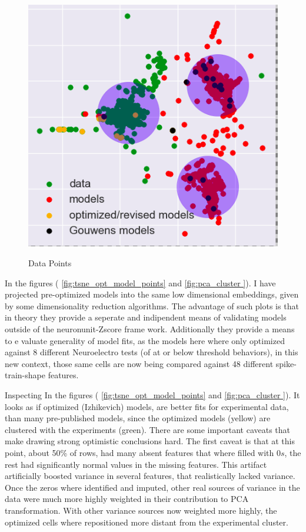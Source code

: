 \begin{figure}    
\begin{center} \includegraphics[width=0.75\linewidth]{figures/data_experiment_fits.png}
    \label{fig:}
\end{center}
\caption[PCA clustering]{Data Points}
\label{fig:pca_cluster}
\end{figure}    


In the figures ( \ref{fig:tsne_opt_model_points} and \ref{fig:pca_cluster
}). I have projected pre-optimized models into the same low dimensional embeddings, given by some dimensionality reduction algorithms. The advantage of such plots is that in theory they provide a seperate and indipendent means of validating models outside of the neuronunit-Zscore frame work. Additionally they provide a means to e valuate generality of model fits, as the models here where only optimized against 8 different Neuroelectro tests (of at or below threshold behaviors), in this new context, those same cells are now being compared against 48 different spike-train-shape features.

Inspecting In the figures ( \ref{fig:tsne_opt_model_points} and \ref{fig:pca_cluster
}). It looks as if optimized (Izhikevich) models, are better fits for experimental data, than many pre-published models, since the optimized models (yellow) are clustered with the experiments (green). There are some important caveats that make drawing strong optimistic conclusions hard. The first caveat is that at this point, about 50\% of rows, had many absent features that where filled with $0s$, the rest had significantly normal values in the missing features. This artifact artificially boosted variance in several features, that realistically lacked variance. Once the zeros where identified and imputed, other real sources of variance in the data were much more highly weighted in their contribution to PCA transformation. With other variance sources now weighted more highly, the optimized cells where repositioned more distant from the experimental cluster.

